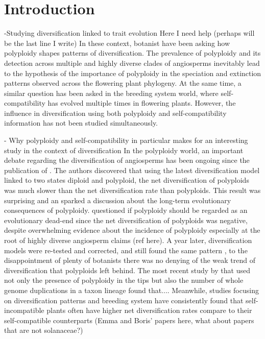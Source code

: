 \section{Introduction}
-Studying diversification linked to trait evolution\newline
Here I need help (perhaps will be the last line I write)\newline
In these context, botanist have been asking how polyploidy shapes patterns of diversification. The prevalence of polyploidy and its detection across multiple and highly diverse clades of angiosperms inevitably lead to the hypothesis of the importance of polyploidy in the speciation and extinction patterns observed across the flowering plant phylogeny. At the same time, a similar question has been asked in the breeding system world, where self-compatibility has evolved multiple times in flowering plants. However, the influence in diversification using both polyploidy and self-compatibility information has not been studied simultaneously.


- Why polyploidy and self-compatibility in particular makes for an  interesting study in the context of diversification\newline
In the polyploidy world, an important debate regarding the diversification of angiosperms has been ongoing since the publication of \citet{mayrose_2011}. The authors discovered that using the latest diversification model linked to two states diploid and polyploid, the net diversification of polyploids was much slower than the net diversification rate than polyploids. This result was surprising and an sparked a discussion about the long-term evolutionary consequences of polyploidy. \citet{soltis_2014} questioned if polyploidy should be regarded as an evolutionary dead-end since the net diversification of polyploids was negative, despite overwhelming evidence about the incidence of polyploidy  especially at the root of highly diverse angiosperm claims (ref here). A year later, diversification models were re-tested and corrected, and still found the same pattern \citep{mayrose_2015}, to the disappointment of plenty of botanists there was no denying of the weak trend of diversification that polyploids left behind. The most recent study by \citet{landis_2018} that used not only the presence of polyploidy in the tips but also the number of whole genome duplications in a taxon lineage found that.... \newline  Meanwhile, studies focusing on diversification patterns and  breeding system have consistently found that self-incompatible plants often have higher net diversification rates compare to their self-compatible counterparts (Emma and Boris' papers here, what about papers that are not solanaceae?) 

